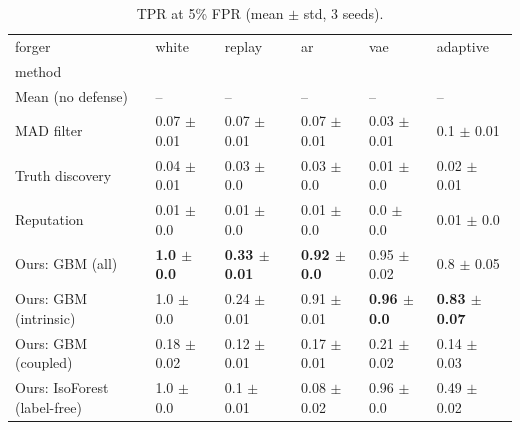 \begin{table}
\caption{TPR at 5\% FPR (mean $\pm$ std, 3 seeds).}
\label{tab:tpr}
\begin{tabular}{llllll}
\toprule
forger & white & replay & ar & vae & adaptive \\
method &  &  &  &  &  \\
\midrule
Mean (no defense) & -- & -- & -- & -- & -- \\
MAD filter & 0.07 $\pm$ 0.01 & 0.07 $\pm$ 0.01 & 0.07 $\pm$ 0.01 & 0.03 $\pm$ 0.01 & 0.1 $\pm$ 0.01 \\
Truth discovery & 0.04 $\pm$ 0.01 & 0.03 $\pm$ 0.0 & 0.03 $\pm$ 0.0 & 0.01 $\pm$ 0.0 & 0.02 $\pm$ 0.01 \\
Reputation & 0.01 $\pm$ 0.0 & 0.01 $\pm$ 0.0 & 0.01 $\pm$ 0.0 & 0.0 $\pm$ 0.0 & 0.01 $\pm$ 0.0 \\
Ours: GBM (all) & \textbf{1.0 $\pm$ 0.0} & \textbf{0.33 $\pm$ 0.01} & \textbf{0.92 $\pm$ 0.0} & 0.95 $\pm$ 0.02 & 0.8 $\pm$ 0.05 \\
Ours: GBM (intrinsic) & 1.0 $\pm$ 0.0 & 0.24 $\pm$ 0.01 & 0.91 $\pm$ 0.01 & \textbf{0.96 $\pm$ 0.0} & \textbf{0.83 $\pm$ 0.07} \\
Ours: GBM (coupled) & 0.18 $\pm$ 0.02 & 0.12 $\pm$ 0.01 & 0.17 $\pm$ 0.01 & 0.21 $\pm$ 0.02 & 0.14 $\pm$ 0.03 \\
Ours: IsoForest (label-free) & 1.0 $\pm$ 0.0 & 0.1 $\pm$ 0.01 & 0.08 $\pm$ 0.02 & 0.96 $\pm$ 0.0 & 0.49 $\pm$ 0.02 \\
\bottomrule
\end{tabular}
\end{table}
